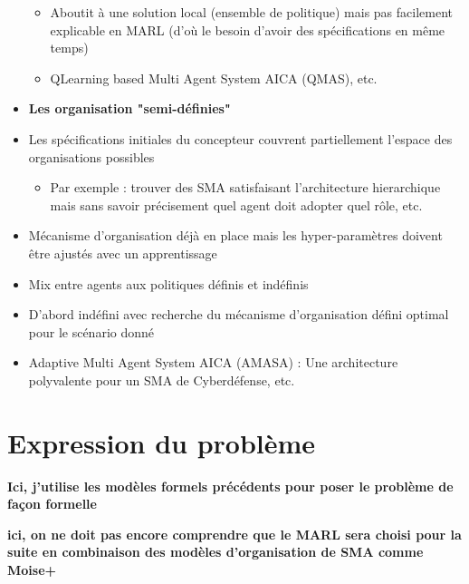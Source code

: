 \begin{itemize}
\begin{itemize}
              \item Aboutit à une solution local (ensemble de politique) mais pas facilement explicable en MARL (d'où le besoin d'avoir des spécifications en même temps)
              \item QLearning based Multi Agent System AICA (QMAS), etc.
          \end{itemize}
    \item \textbf{Les organisation "semi-définies"}
    \item Les spécifications initiales du concepteur couvrent partiellement l'espace des organisations possibles
          \begin{itemize}
              \item Par exemple : trouver des SMA satisfaisant l'architecture hierarchique mais sans savoir précisement quel agent doit adopter quel rôle, etc.
          \end{itemize}
    \item Mécanisme d’organisation déjà en place mais les hyper-paramètres doivent être ajustés avec un apprentissage
    \item Mix entre agents aux politiques définis et indéfinis
    \item D’abord indéfini avec recherche du mécanisme d’organisation défini optimal pour le scénario donné
    \item Adaptive Multi Agent System AICA (AMASA) : Une architecture polyvalente pour un SMA de Cyberdéfense, etc.
\end{itemize}

\section{Expression du problème}
\textbf{Ici, j'utilise les modèles formels précédents pour poser le problème de façon formelle}

\textbf{ici, on ne doit pas encore comprendre que le MARL sera choisi pour la suite en combinaison des modèles d'organisation de SMA comme Moise+}

